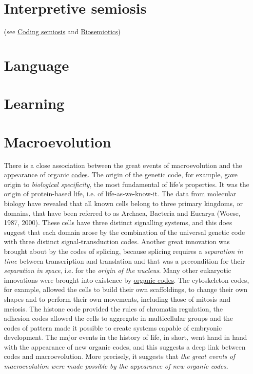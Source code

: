 \documentclass[12pt]{article}
\begin{document}
\hypertarget{interpretive_semiosis}{}
\section{Interpretive semiosis} (see \hyperlink{coding_semiosis}{Coding semiosis} and \hyperlink{biosemiotics}{Biosemiotics})

\hypertarget{language}{}
\section{Language}

\hypertarget{learning}{}
\section{Learning}

\hypertarget{macroevolution}{}
\section{Macroevolution} 
There is a close association between the great events of macroevolution and the appearance of organic \hyperlink{code}{codes}. The origin of the genetic code, for example, gave origin to \textit{biological specificity}, the most fundamental of life's properties. It was the origin of protein-based life, i.e. of life-as-we-know-it. The data from molecular biology have revealed that all known cells belong to three primary kingdoms, or domains, that have been referred to as Archaea, Bacteria and Eucarya (Woese, 1987, 2000). These cells have three distinct signalling systems, and this does suggest that each domain arose by the combination of the universal genetic code with three distinct signal-transduction codes. Another great innovation was brought about by the codes of splicing, because splicing requires a \textit{separation in time} between transcription and translation and that was a precondition for their \textit{separation in space}, i.e. for the \textit{origin of the nucleus}. Many other eukaryotic innovations were brought into existence by \hyperlink{organic_codes}{organic codes}. The cytoskeleton codes, for example, allowed the cells to build their own scaffoldings, to change their own shapes and to perform their own movements, including those of mitosis and meiosis. The histone code provided the rules of chromatin regulation, the adhesion codes allowed the cells to aggregate in multicellular groups and the codes of pattern made it possible to create systems capable of embryonic development. The major events in the history of life, in short, went hand in hand with the appearance of new organic codes, and this suggests a deep link between codes and macroevolution. More precisely, it suggests that \textit{the great events of macroevolution were made possible by the appearance of new organic codes}. 
\end{document}
